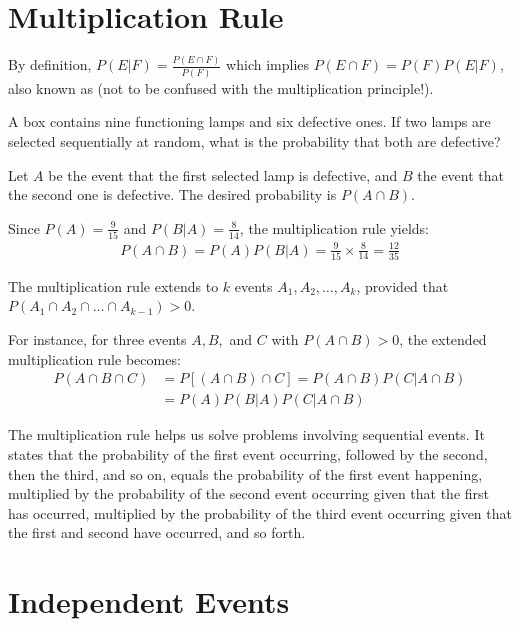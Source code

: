 \section{Multiplication Rule}

By definition, \( P(E | F) = \frac{P(E \cap F)}{P(F)} \) which implies \( P(E \cap F) = P(F)P(E | F) \), also known as  (not to be confused with the multiplication principle!).

\begin{exmp}
	A box contains nine functioning lamps and six defective ones.
	If two lamps are selected sequentially at random, what is the probability that both are defective?
\end{exmp}
\begin{solution}
	Let \( A \) be the event that the first selected lamp is defective, and \( B \) the event that the second one is defective.
	The desired probability is \( P(A \cap B) \).

	Since \( P(A) = \frac{9}{15} \) and \( P(B | A) = \frac{8}{14} \), the multiplication rule yields:
	\begin{gather*}
		P(A \cap B) = P(A)P(B | A) = \frac{9}{15} \times \frac{8}{14} = \frac{12}{35}
	\end{gather*}
\end{solution}

The multiplication rule extends to \( k \) events \( A_1, A_2, \ldots, A_k \),
provided that \( P(A_1 \cap A_2 \cap \ldots \cap A_{k - 1}) > 0 \).

For instance, for three events \( A, B, \) and \( C \) with \( P(A \cap B) > 0 \),
the extended multiplication rule becomes:
\begin{align*}
	P(A \cap B \cap C) &= P[(A \cap B) \cap C] = P(A \cap B)P(C | A \cap B)\\
	&= P(A)P(B | A)P(C | A \cap B)
\end{align*}

The multiplication rule helps us solve problems involving sequential events.
It states that the probability of the first event occurring, followed by the second, then the third, and so on,
equals the probability of the first event happening, multiplied by the probability of the second event occurring given that the first has occurred, multiplied by the probability of the third event occurring given that the first and second have occurred, and so forth.

\section{Independent Events}

